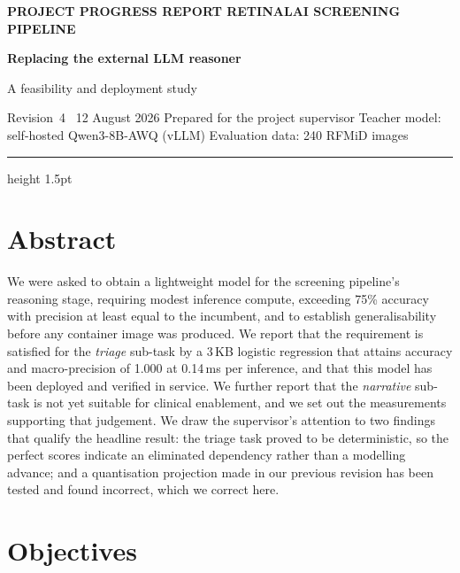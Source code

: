 \documentclass[11pt,a4paper]{article}
\newcommand{\eyebrow}[1]{%
  {\footnotesize\sffamily\bfseries\textcolor{accent}{\MakeUppercase{#1}}}}
\begin{document}
\begin{flushleft}
\eyebrow{Project progress report \quad\textbullet\quad RetinalAI screening pipeline}

\vspace{6pt}
{\huge\bfseries Replacing the external LLM reasoner\par}

\vspace{6pt}
{\Large\color{inkMuted} A feasibility and deployment study\par}

\vspace{10pt}
{\footnotesize\sffamily\color{inkMuted}
Revision~4 \textbullet\ 12 August 2026 \quad\textbar\quad
Prepared for the project supervisor \quad\textbar\quad
Teacher model: self-hosted Qwen3-8B-AWQ (vLLM) \quad\textbar\quad
Evaluation data: 240 RFMiD images\par}
\end{flushleft}

\vspace{2pt}
{\color{ruleGrey}\hrule height 1.5pt}
\vspace{10pt}

\section*{Abstract}

We were asked to obtain a lightweight model for the screening pipeline's
reasoning stage, requiring modest inference compute, exceeding 75\% accuracy
with precision at least equal to the incumbent, and to establish
generalisability before any container image was produced. We report that the
requirement is satisfied for the \emph{triage} sub-task by a 3\,KB logistic
regression that attains accuracy and macro-precision of 1.000 at 0.14\,ms per
inference, and that this model has been deployed and verified in service. We
further report that the \emph{narrative} sub-task is not yet suitable for
clinical enablement, and we set out the measurements supporting that judgement.
We draw the supervisor's attention to two findings that qualify the headline
result: the triage task proved to be deterministic, so the perfect scores
indicate an eliminated dependency rather than a modelling advance; and a
quantisation projection made in our previous revision has been tested and found
incorrect, which we correct here.

\section{Objectives}
\end{document}

